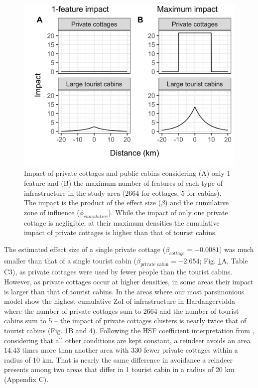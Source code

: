 \documentclass[titlepage]{article}
\begin{document}
\begin{figure}[h]
\centering
\includegraphics[width=1\textwidth,center]{figures/reindeer_zoi_impact_single_multiple_features.png}
\caption{\label{fig:impact_plot} Impact of private cottages and public cabins considering (A) only 1 feature and (B) the maximum number of features of each type of infrastructure in the study area (2664 for cottages, 5 for cabins). The impact is the product of the effect size ($\beta$) and the cumulative zone of influence ($\phi_{cumulative}$). While the impact of only one private cottage is negligible, at their maximum densities the cumulative impact of private cottages is higher than that of tourist cabins.}
\end{figure}

The estimated effect size of a single private
cottage ($\beta_{cottage} = -0.0081$) was much smaller than that of a single tourist cabin
($\beta_{\text{private cabin}} = -2.654$; Fig. \ref{fig:impact_plot}A, Table C3), as
private cottages were used by fewer people than the tourist cabins. However, as
private cottages occur at higher densities, in some areas their impact 
is larger than that of tourist cabins. In the areas where our most parsimonious model show the 
highest cumulative ZoI of infrastructure in Hardangervidda -- where the number of private cottages sum to 2664
and the number of tourist cabins sum to 5 -- the impact of 
private cottages clusters is nearly twice that of tourist cabins
(Fig. \ref{fig:impact_plot}B and 4). Following the HSF coefficient interpretation from \citet{fieberg_how_2021}, considering that all other conditions are kept constant, a reindeer avoids an area 14.43 times more than another area with
330 fewer private cottages within a radius of 10 km. That is nearly the same difference in avoidance a reindeer presents among two areas that differ in 1 tourist cabin in a radius of 20 km (Appendix C).
\end{document}
